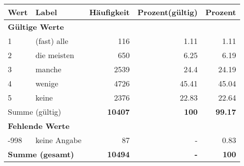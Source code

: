      \begin{longtable}{lXrrr}
     \toprule
     \textbf{Wert} & \textbf{Label} & \textbf{Häufigkeit} & \textbf{Prozent(gültig)} & \textbf{Prozent} \\
     \endhead
     \midrule
     \multicolumn{5}{l}{\textbf{Gültige Werte}}\\

     1 &
     \multicolumn{1}{X}{ (fast) alle   } &


       \num{116} &
       \num[round-mode=places,round-precision=2]{1.11} &
         \num[round-mode=places,round-precision=2]{1.11} \\

     2 &
     \multicolumn{1}{X}{ die meisten   } &


       \num{650} &
       \num[round-mode=places,round-precision=2]{6.25} &
         \num[round-mode=places,round-precision=2]{6.19} \\

     3 &
     \multicolumn{1}{X}{ manche   } &


       \num{2539} &
       \num[round-mode=places,round-precision=2]{24.4} &
         \num[round-mode=places,round-precision=2]{24.19} \\

     4 &
     \multicolumn{1}{X}{ wenige   } &


       \num{4726} &
       \num[round-mode=places,round-precision=2]{45.41} &
         \num[round-mode=places,round-precision=2]{45.04} \\

     5 &
     \multicolumn{1}{X}{ keine   } &


       \num{2376} &
       \num[round-mode=places,round-precision=2]{22.83} &
         \num[round-mode=places,round-precision=2]{22.64} \\
     \midrule
     \multicolumn{2}{l}{Summe (gültig)} &
       \textbf{\num{10407}} &
     \textbf{\num{100}} &
       \textbf{\num[round-mode=places,round-precision=2]{99.17}} \\
     \multicolumn{5}{l}{\textbf{Fehlende Werte}}\\
       -998 &
       keine Angabe &
         \num{87} &
        - &
         \num[round-mode=places,round-precision=2]{0.83} \\
     \midrule
     \multicolumn{2}{l}{\textbf{Summe (gesamt)}} &
          \textbf{\num{10494}} &
        \textbf{-} &
        \textbf{\num{100}} \\
     \bottomrule
     \end{longtable}
     
